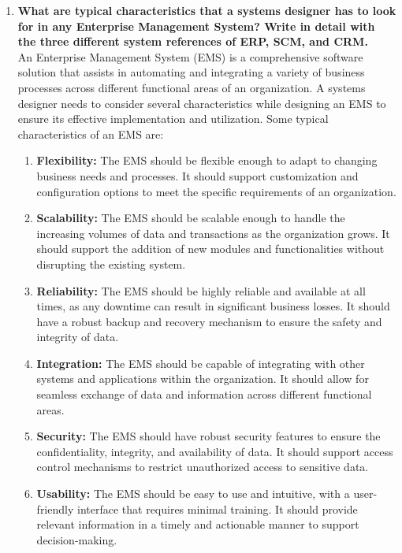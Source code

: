 \documentclass[12pt]{article}
\begin{document}
\begin{enumerate}
\item {\bfseries What are typical characteristics that a systems designer has to look for in any Enterprise Management System? Write in detail with the three different system references of ERP, SCM, and CRM.\\}
An Enterprise Management System (EMS) is a comprehensive software solution that assists in automating and integrating a variety of business processes across different functional areas of an organization. A systems designer needs to consider several characteristics while designing an EMS to ensure its effective implementation and utilization. Some typical characteristics of an EMS are:
\begin{enumerate}
    \item \textbf{Flexibility:} The EMS should be flexible enough to adapt to changing business needs and processes. It should support customization and configuration options to meet the specific requirements of an organization.
    

    \item \textbf{Scalability:} The EMS should be scalable enough to handle the increasing volumes of data and transactions as the organization grows. It should support the addition of new modules and functionalities without disrupting the existing system.
    
    \item \textbf{Reliability:} The EMS should be highly reliable and available at all times, as any downtime can result in significant business losses. It should have a robust backup and recovery mechanism to ensure the safety and integrity of data.
    
    \item \textbf{Integration:} The EMS should be capable of integrating with other systems and applications within the organization. It should allow for seamless exchange of data and information across different functional areas.
    
    \item \textbf{Security:} The EMS should have robust security features to ensure the confidentiality, integrity, and availability of data. It should support access control mechanisms to restrict unauthorized access to sensitive data.
    
    \item \textbf{Usability:} The EMS should be easy to use and intuitive, with a user-friendly interface that requires minimal training. It should provide relevant information in a timely and actionable manner to support decision-making.
    \end{enumerate}
    

\end{enumerate}
\end{document}
